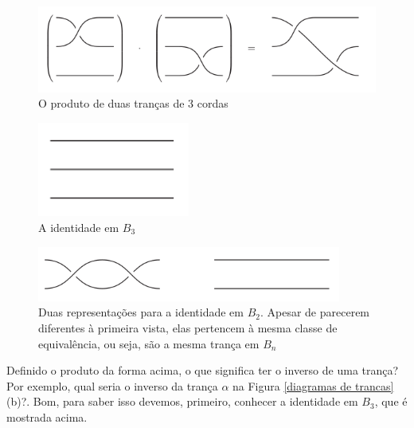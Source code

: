 	\begin{figure}[H]
		\captionsetup{justification=centering}
		\begin{center}
			\includegraphics[width=12cm]{Images/produto.png}
		\end{center}\caption{O produto de duas tranças de 3 cordas
		}\label{produto de trancas}
	\end{figure}
	
	\begin{figure}[H]
		\captionsetup{justification=centering}
		\begin{center}
			\includegraphics[width=5cm]{Images/identidade_b3.png}
		\end{center}\caption{A identidade em $B_3$}\label{identidade em b3}
	\end{figure}
	
	\begin{figure}[H]
		
		\captionsetup{justification=centering}
		\begin{center}
			\includegraphics[width=10cm]{Images/identidade_b2.png}
		\end{center}\caption{Duas representações para a identidade em $B_2$. Apesar de parecerem diferentes à primeira vista, elas pertencem à mesma classe de equivalência, ou seja, são a mesma trança em $B_n$}\label{identidade b2}
	\end{figure}
	
	\par\vspace{0.3cm} Definido o produto da forma acima, o que significa ter o inverso de uma trança? Por exemplo, qual seria o inverso da trança $\alpha$ na Figura \eqref{diagramas de trancas}(b)?. Bom, para saber isso devemos, primeiro, conhecer a identidade em $B_3$, que é mostrada acima.
	
